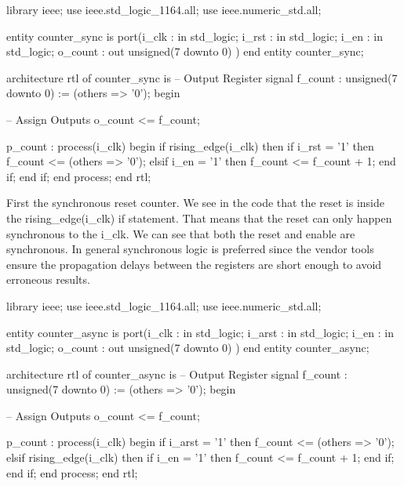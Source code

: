 \begin{VHDLlisting}[tabsize=8]
library ieee;
  use ieee.std_logic_1164.all;
  use ieee.numeric_std.all;
  
entity counter_sync is
port(i_clk   : in    std_logic;
     i_rst   : in    std_logic;
     i_en    : in    std_logic;
     o_count :   out unsigned(7 downto 0)	
)
end entity counter_sync;

architecture rtl of counter_sync is
    -- Output Register
    signal f_count : unsigned(7 downto 0) := (others => '0');
begin

    -- Assign Outputs
    o_count <= f_count;

    p_count : process(i_clk)
    begin
        if rising_edge(i_clk) then
            if i_rst = '1' then
                f_count <= (others => '0');
            elsif i_en = '1' then
                f_count <= f_count + 1;
            end if;		
        end if;
    end process;
end rtl;

\end{VHDLlisting}
	
First the synchronous reset counter. We see in the code that the reset is inside the rising\_edge(i\_clk) if statement. That means that the reset can only happen synchronous to the i\_clk. We can see that both the reset and enable are synchronous. In general synchronous logic is preferred since the vendor tools ensure the propagation delays between the registers are short enough to avoid erroneous results.


\begin{VHDLlisting}[tabsize=8]
library ieee;
  use ieee.std_logic_1164.all;
  use ieee.numeric_std.all;
  
entity counter_async is
port(i_clk   : in    std_logic;
     i_arst  : in    std_logic;
     i_en    : in    std_logic;
     o_count :   out unsigned(7 downto 0)	
)
end entity counter_async;

architecture rtl of counter_async is
    -- Output Register
    signal f_count : unsigned(7 downto 0) := (others => '0');
begin

    -- Assign Outputs
    o_count <= f_count;

    p_count : process(i_clk)
    begin
        if i_arst = '1' then
            f_count <= (others => '0');
        elsif rising_edge(i_clk) then
            if i_en = '1' then
                f_count <= f_count + 1;
            end if;		
        end if;
    end process;
end rtl;

\end{VHDLlisting}
	
